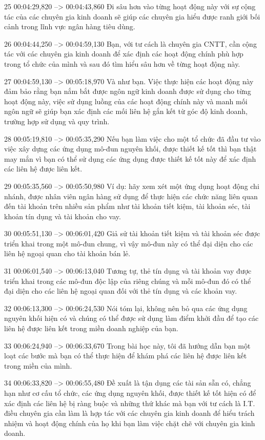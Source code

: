 25
00:04:29,820 --> 00:04:43,860
Đi sâu hơn vào từng hoạt động này với sự cộng tác của các chuyên gia kinh doanh sẽ giúp các chuyên gia hiểu được ranh giới bối cảnh trong lĩnh vực ngân hàng tiêu dùng.

26
00:04:44,250 --> 00:04:59,130
Bạn, với tư cách là chuyên gia CNTT, cần cộng tác với các chuyên gia kinh doanh để xác định các hoạt động chính phù hợp trong tổ chức của mình và sau đó tìm hiểu sâu hơn về từng hoạt động này.

27
00:04:59,130 --> 00:05:18,970
Và như bạn.  Việc thực hiện các hoạt động này đảm bảo rằng bạn nắm bắt được ngôn ngữ kinh doanh được sử dụng cho từng hoạt động này, việc sử dụng luồng của các hoạt động chính này và manh mối ngôn ngữ sẽ giúp bạn xác định các mối liên hệ gắn kết từ góc độ kinh doanh, trường hợp sử dụng và quy trình.

28
00:05:19,810 --> 00:05:35,290
Nếu bạn làm việc cho một tổ chức đã đầu tư vào việc xây dựng các ứng dụng mô-đun nguyên khối, được thiết kế tốt thì bạn thật may mắn vì bạn có thể sử dụng các ứng dụng được thiết kế tốt này để xác định các liên hệ được liên kết.

29
00:05:35,560 --> 00:05:50,980
Ví dụ: hãy xem xét một ứng dụng hoạt động chi nhánh, được nhân viên ngân hàng sử dụng để thực hiện các chức năng liên quan đến tài khoản trên nhiều sản phẩm như tài khoản tiết kiệm, tài khoản séc, tài khoản tín dụng và tài khoản cho vay.

30
00:05:51,130 --> 00:06:01,420
Giả sử tài khoản tiết kiệm và tài khoản séc được triển khai trong một mô-đun chung, vì vậy mô-đun này có thể đại diện cho các liên hệ ngoại quan cho tài khoản bán lẻ.

31
00:06:01,540 --> 00:06:13,040
Tương tự, thẻ tín dụng và tài khoản vay được triển khai trong các mô-đun độc lập của riêng chúng và mỗi mô-đun đó có thể đại diện cho các liên hệ ngoại quan đối với thẻ tín dụng và các khoản vay.

32
00:06:13,300 --> 00:06:24,530
Nói tóm lại, không nên bỏ qua các ứng dụng nguyên khối hiện có và chúng có thể được sử dụng làm điểm khởi đầu để tạo các liên hệ được liên kết trong miền doanh nghiệp của bạn.

33
00:06:24,940 --> 00:06:33,670
Trong bài học này, tôi đã hướng dẫn bạn một loạt các bước mà bạn có thể thực hiện để khám phá các liên hệ được liên kết trong miền của mình.

34
00:06:33,820 --> 00:06:55,480
Đề xuất là tận dụng các tài sản sẵn có, chẳng hạn như cơ cấu tổ chức, các ứng dụng nguyên khối, được thiết kế tốt hiện có để xác định các liên hệ bị ràng buộc và những thứ khác mà bạn với tư cách là I.T.  điều chuyên gia cần làm là hợp tác với các chuyên gia kinh doanh để hiểu trách nhiệm và hoạt động chính của họ khi bạn làm việc chặt chẽ với chuyên gia kinh doanh.

